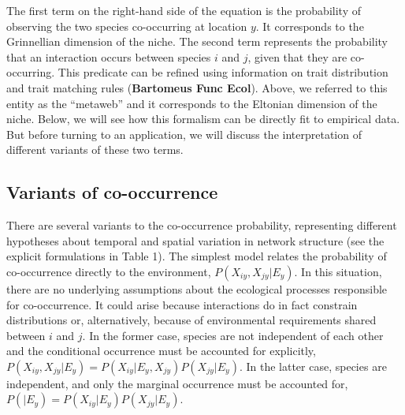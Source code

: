 \documentclass[12pt]{article}
\begin{document}
The first term on the right-hand side of the equation is the probability
of observing the two species co-occurring at location $y$. It corresponds
to the Grinnellian dimension of the niche. The second term represents the
probability that an interaction occurs between species $i$ and $j$, given that
they are co-occurring. This predicate can be refined using information on
trait distribution and trait matching rules (\textbf{Bartomeus Func Ecol}).
Above, we referred to this entity as the ``metaweb'' and it corresponds to
the Eltonian dimension of the niche. Below, we will see how this formalism
can be directly fit to empirical data. But before turning to an application,
we will discuss the interpretation of different variants of these two terms.

\subsection*{Variants of co-occurrence}

There are several variants to the co-occurrence probability, representing
different hypotheses about temporal and spatial variation in network structure
(see the explicit formulations in Table 1). The simplest model relates the
probability of co-occurrence directly to the environment, $P(X_{iy},X_{jy}|E_y)$.
In this situation, there are no underlying assumptions about the ecological
processes responsible for co-occurrence. It could arise because interactions
do in fact constrain distributions \citep{Pollock2014, Cazelles2016} or,
alternatively, because of environmental requirements shared between $i$ and
$j$. In the former case, species are not independent of each other and the
conditional occurrence must be accounted for explicitly, $P(X_{iy},X_{jy}
|E_y)=P(X_{iy}|E_y,X_{jy})P(X_{jy}|E_y)$. In the latter case, species are
independent, and only the marginal occurrence must be accounted for, $P(
|E_y)=P(X_{iy} |E_y)P(X_{jy} |E_y)$.
\end{document}
